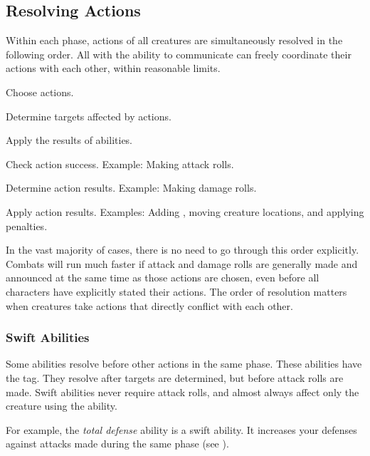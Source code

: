     \subsection{Resolving Actions}\label{Resolving Actions}

        Within each phase, actions of all creatures are simultaneously resolved in the following order.
        All  with the ability to communicate can freely coordinate their actions with each other, within reasonable limits.

        \begin{enumerate*}
            \item Choose actions.
            \item Determine targets affected by actions.
            \item Apply the results of  abilities.
            \item Check action success.
                Example: Making attack rolls.
            \item Determine action results.
                Example: Making damage rolls.
            \item Apply action results.
                Examples: Adding , moving creature locations, and applying penalties.
        \end{enumerate*}

        In the vast majority of cases, there is no need to go through this order explicitly.
        Combats will run much faster if attack and damage rolls are generally made and announced at the same time as those actions are chosen, even before all characters have explicitly stated their actions.
        The order of resolution matters when creatures take actions that directly conflict with each other.

        \subsubsection{Swift Abilities}\label{Swift Abilities}
            Some abilities resolve before other actions in the same phase.
            These abilities have the  tag.
            They resolve after targets are determined, but before attack rolls are made.
            Swift abilities never require attack rolls, and almost always affect only the creature using the ability.

            For example, the \textit{total defense} ability is a swift ability.
            It increases your defenses against attacks made during the same phase (see ).

